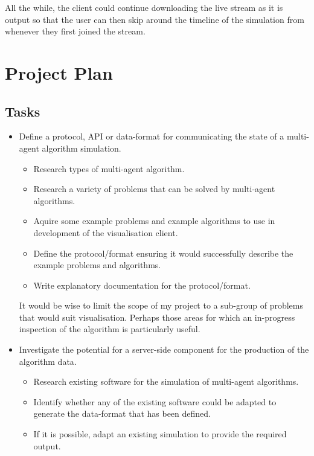 \documentclass[a4paper]{article}
\begin{document}
		All the while, the client could continue downloading the live stream as it is output so that the user can then skip around the timeline of the simulation from whenever they first joined the stream.

	\section{Project Plan}

		\subsection{Tasks}

			\begin{itemize}

				\item Define a protocol, \textsc{API} or data-format for communicating the state of a multi-agent algorithm simulation.

					\begin{itemize}

						\item Research types of multi-agent algorithm.
						\item Research a variety of problems that can be solved by multi-agent algorithms.
						\item Aquire some example problems and example algorithms to use in development of the visualisation client.
						\item Define the protocol/format ensuring it would successfully describe the example problems and algorithms.
						\item Write explanatory documentation for the protocol/format.

					\end{itemize}

					It would be wise to limit the scope of my project to a sub-group of problems that would suit visualisation. Perhaps those areas for which an in-progress inspection of the algorithm is particularly useful.

				\item Investigate the potential for a server-side component for the production of the algorithm data.

					\begin{itemize}

						\item Research existing software for the simulation of multi-agent algorithms.
						\item Identify whether any of the existing software could be adapted to generate the data-format that has been defined.
						\item If it is possible, adapt an existing simulation to provide the required output.


\end{itemize}
\end{itemize}
\end{document}
